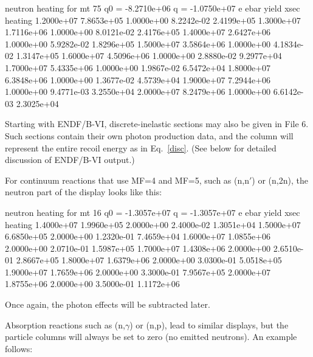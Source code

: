 \small
\begin{ccode}

 neutron heating for mt 75   q0 = -8.2710e+06     q = -1.0750e+07
              e          ebar         yield          xsec       heating
     1.2000e+07    7.8653e+05    1.0000e+00    8.2242e-02    2.4199e+05
     1.3000e+07    1.7116e+06    1.0000e+00    8.0121e-02    2.4176e+05
     1.4000e+07    2.6427e+06    1.0000e+00    5.9282e-02    1.8296e+05
     1.5000e+07    3.5864e+06    1.0000e+00    4.1834e-02    1.3147e+05
     1.6000e+07    4.5096e+06    1.0000e+00    2.8880e-02    9.2977e+04
     1.7000e+07    5.4335e+06    1.0000e+00    1.9867e-02    6.5472e+04
     1.8000e+07    6.3848e+06    1.0000e+00    1.3677e-02    4.5739e+04
     1.9000e+07    7.2944e+06    1.0000e+00    9.4771e-03    3.2550e+04
     2.0000e+07    8.2479e+06    1.0000e+00    6.6142e-03    2.3025e+04

\end{ccode}
\normalsize

\noindent
Starting with ENDF/B-VI, discrete-inelastic sections may also be
given in File 6.  Such sections contain their own photon
production data, and the  column will represent
the entire recoil energy as in Eq.~\ref{disc}.
(See below for detailed discussion of ENDF/B-VI output.)

For continuum reactions that use MF=4 and MF=5, such as (n,n$'$) or
(n,2n), the neutron part of the display looks like this:

\small
\begin{ccode}

 neutron heating for mt 16   q0 = -1.3057e+07     q = -1.3057e+07
              e          ebar         yield          xsec       heating
     1.4000e+07    1.9960e+05    2.0000e+00    2.4000e-02    1.3051e+04
     1.5000e+07    6.6850e+05    2.0000e+00    1.2320e-01    7.4659e+04
     1.6000e+07    1.0855e+06    2.0000e+00    2.0710e-01    1.5987e+05
     1.7000e+07    1.4308e+06    2.0000e+00    2.6510e-01    2.8667e+05
     1.8000e+07    1.6379e+06    2.0000e+00    3.0300e-01    5.0518e+05
     1.9000e+07    1.7659e+06    2.0000e+00    3.3000e-01    7.9567e+05
     2.0000e+07    1.8755e+06    2.0000e+00    3.5000e-01    1.1172e+06

\end{ccode}
\normalsize

\noindent
Once again, the photon effects will be subtracted later.

Absorption reactions such as (n,$\gamma$) or (n,p), lead to
similar displays, but the particle  columns will
always be set to zero (no emitted neutrons).  An example
follows:

